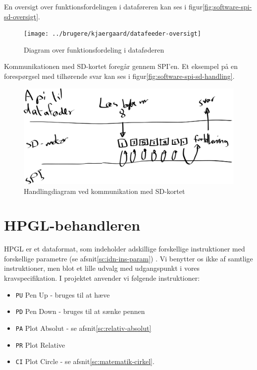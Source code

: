 En oversigt over funktionsfordelingen i
dataføreren kan ses i
figur\vref{fig:software-spi-sd-oversigt}.

\begin{figure}[htbp]
  \centering
  \texttt{[image: ../brugere/kjaergaard/datafeeder-oversigt]}
  \caption{Diagram over funktionsfordeling i dataføderen}
  \label{fig:software-spi-sd-oversigt}
\end{figure}

Kommunikationen med SD-kortet foregår gennem SPI'en. Et eksempel på en forespørgsel med tilhørende svar
kan ses i figur\vref{fig:software-spi-sd-handling}.

\begin{figure}[htbp]
  \centering
  \includegraphics[width=\textwidth]{../brugere/kjaergaard/datafeeder-handling}
  \caption{Handlingdiagram ved kommunikation med SD-kortet}
  \label{fig:software-spi-sd-handling}
\end{figure}


\section{HPGL-behandleren}


HPGL er et dataformat, som indeholder adskillige forskellige
instruktioner med forskellige parametre (se
afsnit\vref{sc:idn-ins-param}) . Vi benytter os ikke af samtlige
instruktioner, men blot et lille udvalg med udgangspunkt i vores
kravspecifikation.  I projektet anvender vi følgende instruktioner:

\begin{itemize} \firmlist
\item \texttt{PU} Pen Up - bruges til at hæve
\item \texttt{PD} Pen Down - bruges til at sænke pennen
\item \texttt{PA} Plot Absolut - se afsnit\vref{sc:relativ-absolut}
\item \texttt{PR} Plot Relative
\item \texttt{CI}  Plot Circle - se afsnit\vref{sc:matematik-cirkel}.
\end{itemize}

